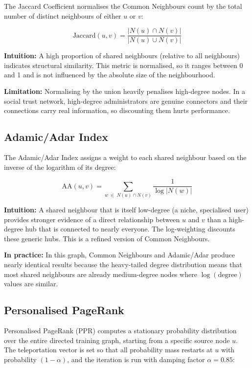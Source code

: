 \documentclass[10pt]{article}
\begin{document}
The Jaccard Coefficient normalises the Common Neighbours count by the total number of distinct neighbours of either $u$ or $v$:

\begin{equation}
  \text{Jaccard}(u, v) = \frac{|N(u) \cap N(v)|}{|N(u) \cup N(v)|}
  \label{eq:jaccard}
\end{equation}

\noindent\textbf{Intuition:} A high proportion of shared neighbours (relative to all neighbours) indicates structural similarity. This metric is normalised, so it ranges between 0 and 1 and is not influenced by the absolute size of the neighbourhood.

\noindent\textbf{Limitation:} Normalising by the union heavily penalises high-degree nodes. In a social trust network, high-degree administrators are genuine connectors and their connections carry real information, so discounting them hurts performance.

\subsection{Adamic/Adar Index}

The Adamic/Adar Index \cite{adamic2003} assigns a weight to each shared neighbour based on the inverse of the logarithm of its degree:

\begin{equation}
  \text{AA}(u, v) = \sum_{w\; \in\; N(u) \cap N(v)} \frac{1}{\log |N(w)|}
  \label{eq:aa}
\end{equation}

\noindent\textbf{Intuition:} A shared neighbour that is itself low-degree (a niche, specialised user) provides stronger evidence of a direct relationship between $u$ and $v$ than a high-degree hub that is connected to nearly everyone. The log-weighting discounts these generic hubs. This is a refined version of Common Neighbours.

\noindent\textbf{In practice:} In this graph, Common Neighbours and Adamic/Adar produce nearly identical results because the heavy-tailed degree distribution means that most shared neighbours are already medium-degree nodes where $\log(\text{degree})$ values are similar.

\subsection{Personalised PageRank}

Personalised PageRank (PPR) \cite{page1999} computes a stationary probability distribution over the entire directed training graph, starting from a specific source node $u$. The teleportation vector is set so that all probability mass restarts at $u$ with probability $(1-\alpha)$, and the iteration is run with damping factor $\alpha = 0.85$:
\end{document}
